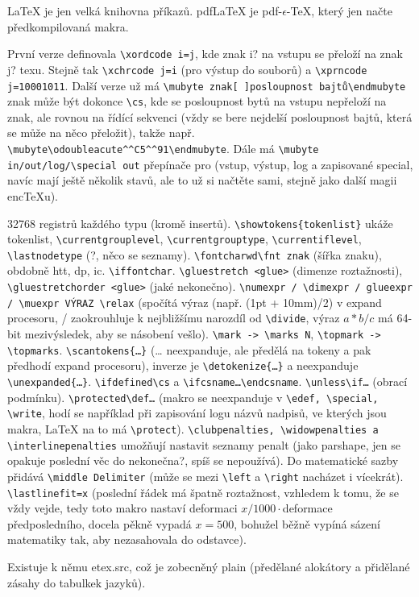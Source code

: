 \documentclass[12pt]{article}					%
\begin{document}
    \begin{upozorneni}
        LaTeX je jen velká knihovna příkazů. pdfLaTeX je pdf-$\epsilon$-TeX, který jen načte předkompilovaná makra.
    \end{upozorneni}

    \begin{definice}[encTeX]
        První verze definovala \verb|\xordcode i=j|, kde znak i? na vstupu se přeloží na znak j? texu. Stejně tak \verb|\xchrcode j=i| (pro výstup do souborů) a \verb|\xprncode j=10001011|. Další verze už má \verb|\mubyte znak[ ]posloupnost bajtů\endmubyte| znak může být dokonce \verb|\cs|, kde se posloupnost bytů na vstupu nepřeloží na znak, ale rovnou na řídící sekvenci (vždy se bere nejdelší posloupnost bajtů, která se může na něco přeložit), takže např. \verb|\mubyte\odoubleacute^^C5^^91\endmubyte|. Dále má \verb|\mubyte in/out/log/\special out| přepínače pro (vstup, výstup, log a zapisované special, navíc mají ještě několik stavů, ale to už si načtěte sami, stejně jako další magii encTeXu).
    \end{definice}

    \begin{definice}
            32768 registrů každého typu (kromě insertů). \verb|\showtokens{tokenlist}| ukáže tokenlist, \verb|\currentgrouplevel|, \verb|\currentgrouptype|, \verb|\currentiflevel|, \verb|\lastnodetype| (?, něco se seznamy). \verb|\fontcharwd\fnt znak| (šířka znaku), obdobně htt, dp, ic. \verb|\iffontchar|. \verb|\gluestretch <glue>| (dimenze roztažnosti), \verb|\gluestretchorder <glue>| (jaké nekonečno). \verb|\numexpr / \dimexpr / glueexpr / \muexpr VÝRAZ \relax| (spočítá výraz (např. (1pt + 10mm)/2) v expand procesoru, / zaokrouhluje k nejbližšímu narozdíl od \verb|\divide|, výraz $a*b/c$ má 64-bit mezivýsledek, aby se násobení vešlo). \verb|\mark -> \marks N|, \verb|\topmark -> \topmarks|. \verb|\scantokens{…}| (… neexpanduje, ale předělá na tokeny a pak předhodí expand procesoru), inverze je \verb|\detokenize{…}| a neexpanduje \verb|\unexpanded{…}|. \verb|\ifdefined\cs| a \verb|\ifcsname…\endcsname|. \verb|\unless\if…| (obrací podmínku). \verb|\protected\def…| (makro se neexpanduje v \verb|\edef, \special, \write|, hodí se například při zapisování logu názvů nadpisů, ve kterých jsou makra, LaTeX na to má \verb|\protect|). \verb|\clubpenalties, \widowpenalties a \interlinepenalties| umožňují nastavit seznamy penalt (jako parshape, jen se opakuje poslední věc do nekonečna?, spíš se nepoužívá). Do matematické sazby přidává \verb|\middle Delimiter| (může se mezi \verb|\left| a \verb|\right| nacházet i vícekrát). \verb|\lastlinefit=x| (poslední řádek má špatně roztažnost, vzhledem k tomu, že se vždy vejde, tedy toto makro nastaví deformaci $x/1000·$deformace předposledního, docela pěkně vypadá $x=500$, bohužel běžně vypíná sázení matematiky tak, aby nezasahovala do odstavce).

        Existuje k němu etex.src, což je zobecněný plain (předělané alokátory a přidělané zásahy do tabulkek jazyků).
    \end{definice}
\end{document}
